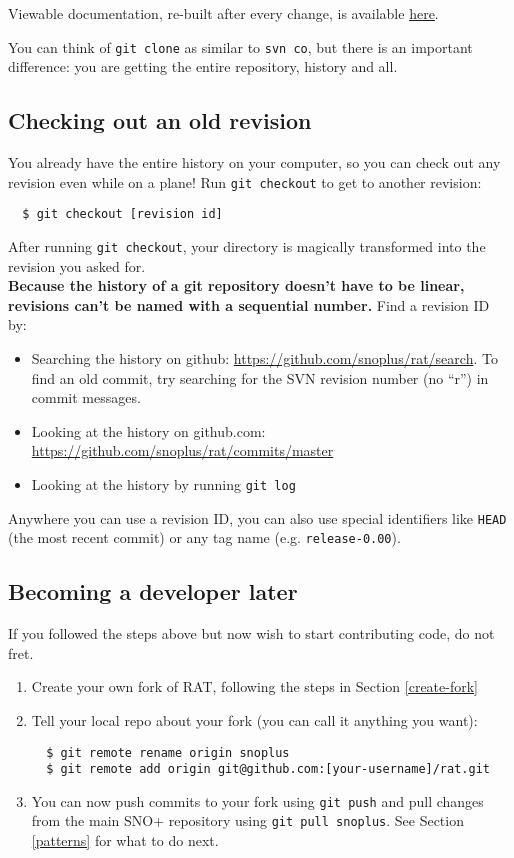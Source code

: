\documentclass{article}
\begin{document}
Viewable documentation, re-built after every change, is available \href{http://ratbuild.hep.upenn.edu/snoplus/doc}{here}.

You can think of {\tt git clone} as similar to {\tt svn co}, but there is an important difference: you are getting the entire repository, history and all.

\subsection{Checking out an old revision}
You already have the entire history on your computer, so you can check out any revision even while on a plane! Run {\tt git checkout} to get to another revision:
\begin{verbatim}
  $ git checkout [revision id]
\end{verbatim}
After running {\tt git checkout}, your directory is magically transformed into the revision you asked for.\\

{\bf Because the history of a git repository doesn't have to be linear, revisions can't be named with a sequential number.} Find a revision ID by:
\begin{itemize}
\item Searching the history on github: \href{https://github.com/snoplus/rat/search}{https://github.com/snoplus/rat/search}. To find an old commit, try searching for the SVN revision number (no ``r'') in commit messages.
\item Looking at the history on github.com: \href{https://github.com/snoplus/rat/commits/master}{https://github.com/snoplus/rat/commits/master}
\item Looking at the history by running {\tt git log}
\end{itemize}

Anywhere you can use a revision ID, you can also use special identifiers like {\tt HEAD} (the most recent commit) or any tag name (e.g. {\tt release-0.00}).

\subsection{Becoming a developer later}
If you followed the steps above but now wish to start contributing code, do not fret.
\begin{enumerate}
\item Create your own fork of RAT, following the steps in Section \ref{create-fork}
\item Tell your local repo about your fork (you can call it anything you want):
\begin{verbatim}
  $ git remote rename origin snoplus
  $ git remote add origin git@github.com:[your-username]/rat.git
\end{verbatim}
\item You can now push commits to your fork using {\tt git push} and pull changes from the main SNO+ repository using {\tt git pull snoplus}. See Section \ref{patterns} for what to do next.
\end{enumerate}
\end{document}
